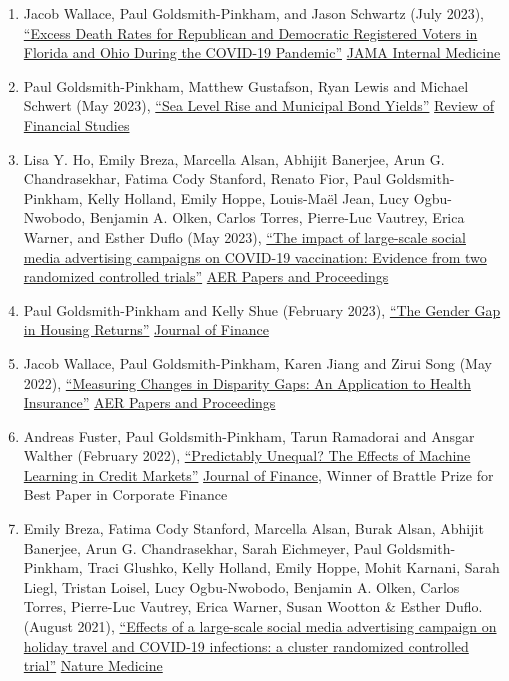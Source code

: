 \documentclass[letterpaper]{article}
\begin{document}
\begin{enumerate}
\item Jacob Wallace, Paul Goldsmith-Pinkham, and Jason Schwartz (July 2023), \href{https://jamanetwork.com/journals/jamainternalmedicine/fullarticle/2807617}{``Excess Death Rates for Republican and Democratic Registered Voters in Florida and Ohio During the COVID-19 Pandemic''} \ul{JAMA Internal Medicine}
\item Paul Goldsmith-Pinkham, Matthew Gustafson, Ryan Lewis and Michael Schwert (May 2023), \href{http://paulgp.github.io/papers/ggls_munis.pdf}{``Sea Level Rise and Municipal Bond Yields''} \ul{Review of Financial Studies}
\item Lisa Y. Ho, Emily Breza, Marcella Alsan, Abhijit Banerjee, Arun G. Chandrasekhar, Fatima Cody Stanford, Renato Fior, Paul Goldsmith-Pinkham, Kelly Holland, Emily Hoppe, Louis-Maël Jean, Lucy Ogbu-Nwobodo, Benjamin A. Olken, Carlos Torres, Pierre-Luc Vautrey, Erica Warner, and Esther Duflo (May 2023), \href{https://paulgp.github.io/papers/submission_manuscript_appendix_social_media_covid_vaccines.pdf}{``The impact of large-scale social media advertising campaigns on COVID-19 vaccination: Evidence from two randomized controlled trials''} \ul{AER Papers and Proceedings}
\item Paul Goldsmith-Pinkham and Kelly Shue (February 2023), \href{https://paulgp.github.io/papers/Gender_Gap_in_Housing_Returns.pdf}{``The Gender Gap in Housing Returns''} \ul{Journal of Finance}
\item  Jacob Wallace, Paul Goldsmith-Pinkham, Karen Jiang and Zirui Song (May 2022), \href{https://paulgp.github.io/papers/aerpp_medicare.pdf}{``Measuring Changes in Disparity Gaps: An Application to Health Insurance''} \ul{AER Papers and Proceedings}
\item Andreas Fuster, Paul Goldsmith-Pinkham, Tarun Ramadorai and Ansgar Walther (February 2022), \href{https://papers.ssrn.com/sol3/papers.cfm?abstract_id=3072038}{``Predictably Unequal? The Effects of Machine Learning in Credit Markets''} \ul{Journal of Finance}, Winner of Brattle Prize for Best Paper in Corporate Finance
\item Emily Breza, Fatima Cody Stanford, Marcella Alsan, Burak Alsan, Abhijit Banerjee, Arun G. Chandrasekhar, Sarah Eichmeyer, Paul Goldsmith-Pinkham, Traci Glushko, Kelly Holland, Emily Hoppe, Mohit Karnani, Sarah Liegl, Tristan Loisel, Lucy Ogbu-Nwobodo, Benjamin A. Olken, Carlos Torres, Pierre-Luc Vautrey, Erica Warner, Susan Wootton \& Esther Duflo. (August 2021), \href{https://www.nature.com/articles/s41591-021-01487-3.pdf}{``Effects of a large-scale social media advertising campaign on holiday travel and COVID-19 infections: a cluster randomized controlled trial''} \ul{Nature Medicine}

\end{enumerate}
\end{document}
